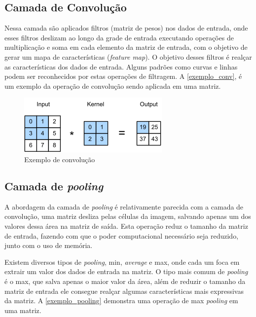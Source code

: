 \subsection{Camada de Convolução}\label{cap_conceitos_cnn_conv}
Nessa camada são aplicados filtros (matriz de pesos) nos dados de entrada, onde esses filtros deslizam ao longo da
grade de entrada executando operações de multiplicação e soma em cada elemento da matriz de entrada, com o objetivo de
gerar um mapa de características (\textit{feature map}).
O objetivo desses filtros é realçar as características dos dados de entrada. Alguns padrões como curvas e linhas podem ser
reconhecidos por estas operações de filtragem.
A \autoref{exemplo_conv}, é um exemplo da operação de convolução sendo aplicada em uma matriz.

\begin{figure}[htb]
	\caption {\label{exemplo_conv} Exemplo de convolução}
	\begin{center}
		\includegraphics[scale=1.0]{Imagens/conv}
	\end{center}
\end{figure}

\subsection{Camada de \textit{pooling}}\label{cap_conceitos_cnn_pooling}
A abordagem da camada de \textit{pooling} é relativamente parecida com a camada de convolução,
uma matriz desliza pelas células da imagem, salvando apenas um dos valores dessa área na matriz de saída.
Esta operação reduz o tamanho da matriz de entrada, fazendo com que o poder computacional necessário seja reduzido,
junto com o uso de memória.

Existem diversos tipos de \textit{pooling}, min, \textit{average} e max, onde cada um foca em extrair um valor dos
dados de entrada na matriz. O tipo mais comum de \textit{pooling} é o max, que salva apenas o maior valor da área,
além de reduzir o tamanho da matriz de entrada ele consegue realçar algumas características mais expressivas da matriz.
A \autoref{exemplo_pooling} demonstra uma operação de max \textit{pooling} em uma matriz.

